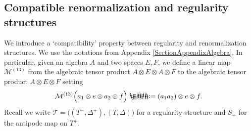\documentclass[10pt, reqno]{amsart}
\makeatletter
\numberwithin{subsection}{section}
\numberwithin{subsubsection}{subsection}
\numberwithin{equation}{section} %
\theoremstyle{mystyle}
\theoremstyle{mystyle2}
\theoremstyle{mystyle3}
\newcommand{\mcM}{\mathcal{M}}
\newcommand*{\defeq}{\mathrel{\rlap{%
                     \raisebox{0.3ex}{$\m@th\cdot$}}%
                     \raisebox{-0.3ex}{$\m@th\cdot$}}%
                     =}
\makeatother
\begin{document}
\bigskip



\subsection{Compatible renormalization and regularity structures}
\label{SubsectionCompatibleStructures}

We introduce a `compatibility' property between regularity and renormalization structures. We use the notations from Appendix {\sf \ref{SectionAppendixAlgebra}}. In particular, given an algebra $A$ and two spaces $E,F$, we define a linear map $\mcM^{(13)}$ from the algebraic tensor product $A\otimes E\otimes A\otimes F$ to the algebraic tensor product $A\otimes E\otimes F$ setting
$$
\mcM^{(13)}\Big(a_1\otimes e\otimes a_2\otimes f\Big) \defeq  (a_1a_2)\otimes e\otimes f.
$$
Recall we write $\mathscr{T}=\big((T^+,\Delta^+),(T,\Delta)\big)$ for a 
regularity structure and $S_+$ for the antipode map on $T^+$.

\medskip
\end{document}
